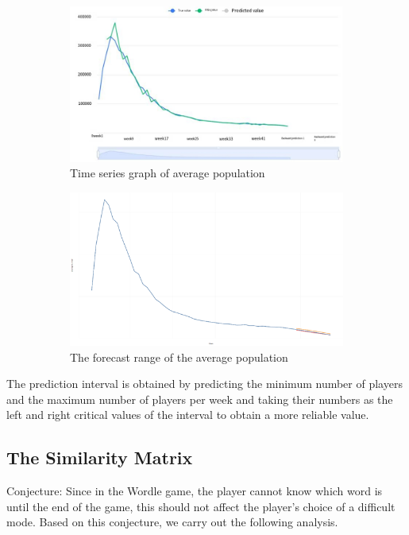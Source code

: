 \documentclass[12pt]{article}  %
\begin{document}
\begin{figure}[htbp]
\centering
\begin{subfigure}{.4\textwidth}
\includegraphics[width=\textwidth]{img/TSP.png}
\caption{Time series graph of average population}\label{subfig:left}
\end{subfigure}
\begin{subfigure}{.4\textwidth}
\includegraphics[width=\textwidth]{img/end .png}
\caption{The forecast range of the average population}\label{subfig:right}
\end{subfigure}
\caption{}
\end{figure}

The prediction interval is obtained by predicting the minimum number of players and the maximum number of players per week and taking their numbers as the left and right critical values of the interval to obtain a more reliable value. 


\subsection{The Similarity Matrix}
Conjecture: Since in the Wordle game, the player cannot know which word is until the end of the game, this should not affect the player's choice of a difficult mode. Based on this conjecture, we carry out the following analysis.
\end{document}
